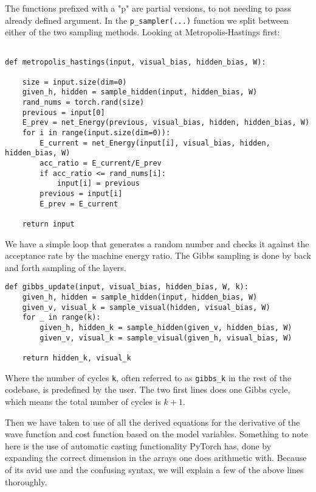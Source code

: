 The functions prefixed with a "p" are partial versions, to not needing to pass already defined argument. In the \texttt{p_sampler(...)} function we split between either of the two sampling methods. Looking at Metropolis-Hastings first:

\begin{verbatim}

def metropolis_hastings(input, visual_bias, hidden_bias, W):
    
    size = input.size(dim=0)
    given_h, hidden = sample_hidden(input, hidden_bias, W)
    rand_nums = torch.rand(size)
    previous = input[0]
    E_prev = net_Energy(previous, visual_bias, hidden, hidden_bias, W)
    for i in range(input.size(dim=0)):
        E_current = net_Energy(input[i], visual_bias, hidden, hidden_bias, W)
        acc_ratio = E_current/E_prev
        if acc_ratio <= rand_nums[i]:
            input[i] = previous
        previous = input[i]
        E_prev = E_current

    return input
\end{verbatim}


We have a simple loop that generates a random number and checks it against the acceptance rate by the machine energy ratio. The Gibbs sampling is done by back and forth sampling of the layers.

\begin{verbatim}
def gibbs_update(input, visual_bias, hidden_bias, W, k):
    given_h, hidden = sample_hidden(input, hidden_bias, W)
    given_v, visual_k = sample_visual(hidden, visual_bias, W)
    for _ in range(k):
        given_h, hidden_k = sample_hidden(given_v, hidden_bias, W)
        given_v, visual_k = sample_visual(given_h, visual_bias, W)
    
    return hidden_k, visual_k
\end{verbatim}

Where the number of cycles \texttt{k}, often referred to as \texttt{gibbs_k} in the rest of the codebase, is predefined by the user. The two first lines does one Gibbs cycle, which means the total number of cycles is $k+1$.

Then we have taken to use of all the derived equations for the derivative of the wave function and cost function based on the model variables. Something to note here is the use of automatic casting functionality PyTorch has, done by expanding the correct dimension in the arrays one does arithmetic with. Because of its avid use and the confusing syntax, we will explain a few of the above lines thoroughly.


